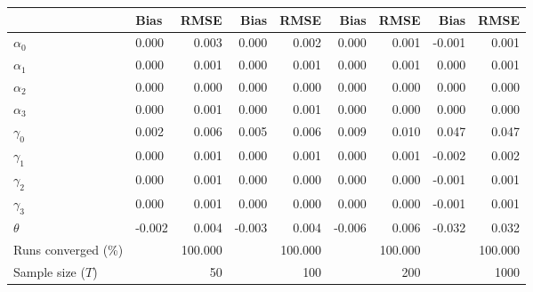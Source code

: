 
\begin{tabular}[t]{llrrrrrrr}
\toprule
  & Bias & RMSE & Bias & RMSE & Bias & RMSE & Bias & RMSE\\
\midrule
$\alpha_{0}$ & 0.000 & 0.003 & 0.000 & 0.002 & 0.000 & 0.001 & -0.001 & 0.001\\
$\alpha_{1}$ & 0.000 & 0.001 & 0.000 & 0.001 & 0.000 & 0.001 & 0.000 & 0.001\\
$\alpha_{2}$ & 0.000 & 0.000 & 0.000 & 0.000 & 0.000 & 0.000 & 0.000 & 0.000\\
$\alpha_{3}$ & 0.000 & 0.001 & 0.000 & 0.001 & 0.000 & 0.000 & 0.000 & 0.000\\
$\gamma_{0}$ & 0.002 & 0.006 & 0.005 & 0.006 & 0.009 & 0.010 & 0.047 & 0.047\\
$\gamma_{1}$ & 0.000 & 0.001 & 0.000 & 0.001 & 0.000 & 0.001 & -0.002 & 0.002\\
$\gamma_{2}$ & 0.000 & 0.001 & 0.000 & 0.000 & 0.000 & 0.000 & -0.001 & 0.001\\
$\gamma_{3}$ & 0.000 & 0.001 & 0.000 & 0.000 & 0.000 & 0.000 & -0.001 & 0.001\\
$\theta$ & -0.002 & 0.004 & -0.003 & 0.004 & -0.006 & 0.006 & -0.032 & 0.032\\
Runs converged (\%) &  & 100.000 &  & 100.000 &  & 100.000 &  & 100.000\\
Sample size ($T$) &  & 50 &  & 100 &  & 200 &  & 1000\\
\bottomrule
\end{tabular}
